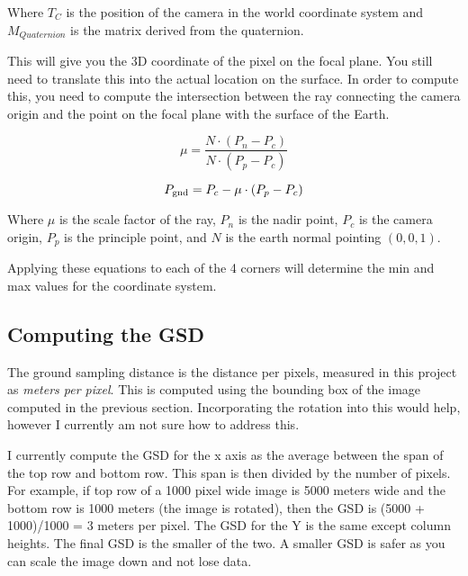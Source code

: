 Where $T_{C}$ is the position of the camera in the world coordinate system and
$M_{Quaternion}$ is the matrix derived from the quaternion. 

This will give you the 3D coordinate of the pixel on the focal plane.  You still need
to translate this into the actual location on the surface.  In order to compute this, you
need to compute the intersection between the ray connecting the camera origin and the 
point on the focal plane with the surface of the Earth.

\begin{equation}
\mu = \frac{N \cdot \left(P_n - P_c\right) }{N \cdot \left(P_p - P_c\right)}
\end{equation}

\begin{equation}
P_{\textup{gnd}} = P_c - \mu \cdot \left( P_{p} - P_{c} \right)
\end{equation}

Where $\mu$ is the scale factor of the ray, $P_n$ is the nadir point, $P_c$ is the camera origin, 
$P_p$ is the principle point, and $N$ is the earth normal pointing $\left( 0, 0, 1\right)$.
 
 
Applying these equations to each of the 4 corners will determine the min and max values for the 
coordinate system. 

\subsection*{Computing the GSD}

The ground sampling distance is the distance per pixels, measured in this project as \emph{meters per pixel}.
This is computed using the bounding box of the image computed in the previous section.  Incorporating the 
rotation into this would help, however I currently am not sure how to address this. 

I currently compute the GSD for the x axis as the average between the span of the top row and bottom row. 
This span is then divided by the number of pixels.  For example, if top row of a 1000 pixel wide image is 5000 meters wide and the bottom
row is 1000 meters (the image is rotated), then the GSD is (5000 + 1000)/1000 = 3 meters per pixel.  The 
GSD for the Y is the same except column heights. The final GSD is the smaller of the two.  A smaller GSD is safer as you can 
scale the image down and not lose data. 

 

